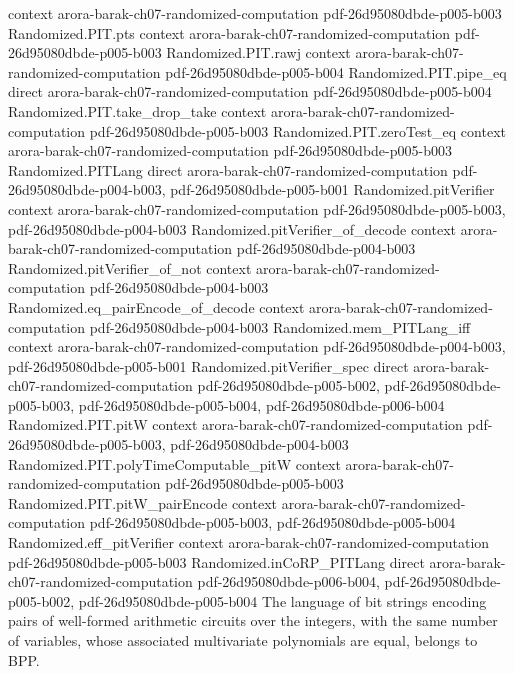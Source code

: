 \begin{theorem}
  {context}
  {arora-barak-ch07-randomized-computation}
  {pdf-26d95080dbde-p005-b003}
\proofstep
  {Randomized.PIT.pts}
  {context}
  {arora-barak-ch07-randomized-computation}
  {pdf-26d95080dbde-p005-b003}
\proofstep
  {Randomized.PIT.rawj}
  {context}
  {arora-barak-ch07-randomized-computation}
  {pdf-26d95080dbde-p005-b004}
\proofstep
  {Randomized.PIT.pipe_eq}
  {direct}
  {arora-barak-ch07-randomized-computation}
  {pdf-26d95080dbde-p005-b004}
\proofstep
  {Randomized.PIT.take_drop_take}
  {context}
  {arora-barak-ch07-randomized-computation}
  {pdf-26d95080dbde-p005-b003}
\proofstep
  {Randomized.PIT.zeroTest_eq}
  {context}
  {arora-barak-ch07-randomized-computation}
  {pdf-26d95080dbde-p005-b003}
\proofstep
  {Randomized.PITLang}
  {direct}
  {arora-barak-ch07-randomized-computation}
  {pdf-26d95080dbde-p004-b003,
    pdf-26d95080dbde-p005-b001}
\proofstep
  {Randomized.pitVerifier}
  {context}
  {arora-barak-ch07-randomized-computation}
  {pdf-26d95080dbde-p005-b003,
    pdf-26d95080dbde-p004-b003}
\proofstep
  {Randomized.pitVerifier_of_decode}
  {context}
  {arora-barak-ch07-randomized-computation}
  {pdf-26d95080dbde-p004-b003}
\proofstep
  {Randomized.pitVerifier_of_not}
  {context}
  {arora-barak-ch07-randomized-computation}
  {pdf-26d95080dbde-p004-b003}
\proofstep
  {Randomized.eq_pairEncode_of_decode}
  {context}
  {arora-barak-ch07-randomized-computation}
  {pdf-26d95080dbde-p004-b003}
\proofstep
  {Randomized.mem_PITLang_iff}
  {context}
  {arora-barak-ch07-randomized-computation}
  {pdf-26d95080dbde-p004-b003,
    pdf-26d95080dbde-p005-b001}
\proofstep
  {Randomized.pitVerifier_spec}
  {direct}
  {arora-barak-ch07-randomized-computation}
  {pdf-26d95080dbde-p005-b002,
    pdf-26d95080dbde-p005-b003,
    pdf-26d95080dbde-p005-b004,
    pdf-26d95080dbde-p006-b004}
\proofstep
  {Randomized.PIT.pitW}
  {context}
  {arora-barak-ch07-randomized-computation}
  {pdf-26d95080dbde-p005-b003,
    pdf-26d95080dbde-p004-b003}
\proofstep
  {Randomized.PIT.polyTimeComputable_pitW}
  {context}
  {arora-barak-ch07-randomized-computation}
  {pdf-26d95080dbde-p005-b003}
\proofstep
  {Randomized.PIT.pitW_pairEncode}
  {context}
  {arora-barak-ch07-randomized-computation}
  {pdf-26d95080dbde-p005-b003,
    pdf-26d95080dbde-p005-b004}
\proofstep
  {Randomized.eff_pitVerifier}
  {context}
  {arora-barak-ch07-randomized-computation}
  {pdf-26d95080dbde-p005-b003}
\proofstep
  {Randomized.inCoRP_PITLang}
  {direct}
  {arora-barak-ch07-randomized-computation}
  {pdf-26d95080dbde-p006-b004,
    pdf-26d95080dbde-p005-b002,
    pdf-26d95080dbde-p005-b004}
The language of bit strings encoding pairs of well-formed arithmetic circuits over the
integers, with the same number of variables, whose associated multivariate polynomials
are equal, belongs to BPP.
\end{theorem}

